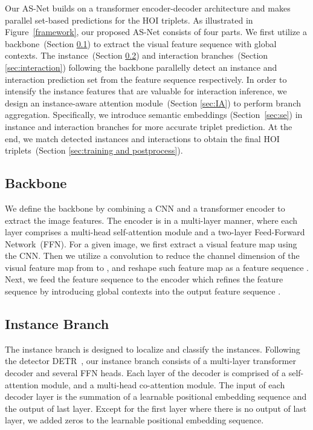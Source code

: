 \documentclass[final]{cvpr}
\begin{document}
Our AS-Net builds on a transformer encoder-decoder architecture and makes parallel set-based predictions for the HOI triplets. As illustrated in Figure~\ref{framework}, our proposed AS-Net consists of four parts. We first utilize a backbone~(Section \ref{sec:backbone}) to extract the visual feature sequence with global contexts. The instance~(Section \ref{sec:instance}) and interaction branches~(Section \ref{sec:interaction}) following the backbone parallelly detect an instance and interaction prediction set from the feature sequence respectively. In order to intensify the instance features that are valuable for interaction inference, we design an instance-aware attention module~(Section \ref{sec:IA}) to perform branch aggregation. Specifically, we introduce semantic embeddings (Section~\ref{sec:se}) in instance and interaction branches for more accurate triplet prediction. At the end, we match detected instances and interactions to obtain the final HOI triplets~(Section \ref{sec:training and postprocess}).
\vspace{-1.5mm}\subsection{Backbone} \label{sec:backbone}\vspace{-1mm}
We define the backbone by combining a CNN and a transformer encoder to extract the image features. The encoder is in a multi-layer manner, where each layer comprises a multi-head self-attention module and a two-layer Feed-Forward Network~(FFN). For a given image, we first extract a visual feature map  using the CNN. Then we utilize a  convolution to reduce the channel dimension of the visual feature map from  to , and reshape such feature map as a feature sequence . Next, we feed the feature sequence to the encoder which refines the feature sequence by introducing global contexts into the output feature sequence .
\vspace{-1.5mm}\subsection{Instance Branch} \label{sec:instance}\vspace{-1mm}
The instance branch is designed to localize and classify the instances. Following the detector DETR~\cite{carion2020endtoend}, our instance branch consists of a multi-layer transformer decoder and several FFN heads. Each layer of the decoder is comprised of a self-attention module, and a multi-head co-attention module. The input of each decoder layer is the summation of a learnable positional embedding sequence  and the output of last layer. Except for the first layer where there is no output of last layer, we added zeros to the learnable positional embedding sequence.
\end{document}
